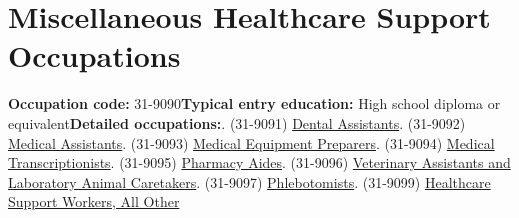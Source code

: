 \documentclass[a4paper,10pt]{article}\usepackage[]{graphicx}\usepackage[]{color}
\begin{document}
\newpage\section{Miscellaneous Healthcare Support Occupations}\textbf{Occupation code:} 31-9090\newline\textbf{Typical entry education:} High school diploma or equivalent\newline\textbf{Detailed occupations:}. (31-9091)  \href{http://www.bls.gov/oes/current/oes319091.htm}{Dental Assistants}. (31-9092)  \href{http://www.bls.gov/oes/current/oes319092.htm}{Medical Assistants}. (31-9093)  \href{http://www.bls.gov/oes/current/oes319093.htm}{Medical Equipment Preparers}. (31-9094)  \href{http://www.bls.gov/oes/current/oes319094.htm}{Medical Transcriptionists}. (31-9095)  \href{http://www.bls.gov/oes/current/oes319095.htm}{Pharmacy Aides}. (31-9096)  \href{http://www.bls.gov/oes/current/oes319096.htm}{Veterinary Assistants and Laboratory Animal Caretakers}. (31-9097)  \href{http://www.bls.gov/oes/current/oes319097.htm}{Phlebotomists}. (31-9099)  \href{http://www.bls.gov/oes/current/oes319099.htm}{Healthcare Support Workers, All Other}\newline%
\end{document}
